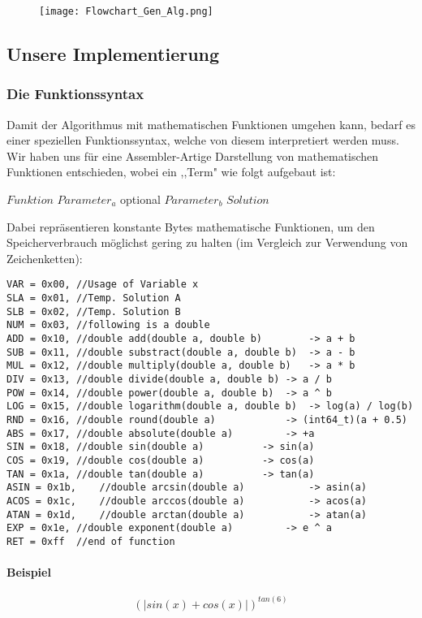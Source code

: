 \documentclass[a4paper,12pt]{article}
\begin{document}
\begin{figure}[H]
\texttt{[image: Flowchart\_Gen\_Alg.png]}
\end{figure}

\subsection{Unsere Implementierung}
\subsubsection{Die Funktionssyntax}
Damit der Algorithmus mit mathematischen Funktionen umgehen kann, bedarf es einer speziellen Funktionssyntax, welche von diesem interpretiert werden muss.\\
Wir haben uns für eine Assembler-Artige Darstellung von mathematischen Funktionen entschieden, wobei ein ,,Term" wie folgt aufgebaut ist:
\indent \begin{center}
$Funktion$ $Parameter_a$ optional $Parameter_b$ $Solution$\\
\end{center}
Dabei repräsentieren konstante Bytes mathematische Funktionen, um den Speicherverbrauch möglichst gering zu halten (im Vergleich zur Verwendung von Zeichenketten):

\begin{verbatim}
VAR = 0x00,	//Usage of Variable x
SLA = 0x01,	//Temp. Solution A
SLB = 0x02,	//Temp. Solution B
NUM = 0x03,	//following is a double
ADD = 0x10,	//double add(double a, double b)		-> a + b
SUB = 0x11,	//double substract(double a, double b)	-> a - b
MUL = 0x12,	//double multiply(double a, double b)	-> a * b
DIV = 0x13,	//double divide(double a, double b)	-> a / b
POW = 0x14,	//double power(double a, double b)	-> a ^ b
LOG = 0x15,	//double logarithm(double a, double b)	-> log(a) / log(b)
RND = 0x16,	//double round(double a)			-> (int64_t)(a + 0.5)
ABS = 0x17,	//double absolute(double a)			-> +a
SIN = 0x18,	//double sin(double a)			-> sin(a)
COS = 0x19,	//double cos(double a)			-> cos(a)
TAN = 0x1a,	//double tan(double a)			-> tan(a)
ASIN = 0x1b,	//double arcsin(double a)			-> asin(a)
ACOS = 0x1c,	//double arccos(double a)			-> acos(a)
ATAN = 0x1d,	//double arctan(double a)			-> atan(a)
EXP = 0x1e,	//double exponent(double a)			-> e ^ a
RET = 0xff	//end of function
\end{verbatim}
\newpage

\paragraph{Beispiel}
\[(|sin(x) + cos(x)|)^{tan(6)}\]\\
\end{document}
